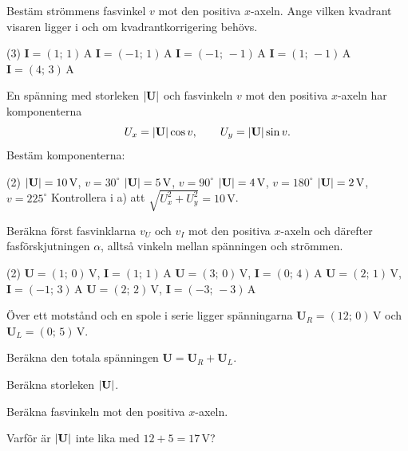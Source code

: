 Bestäm strömmens fasvinkel $v$ mot den positiva $x$-axeln. Ange vilken kvadrant visaren ligger i
och om kvadrantkorrigering behövs.
\begin{delar}(3)
  \task $\mathbf{I} = (1;\, 1)\,\text{A}$
  \task $\mathbf{I} = (-1;\, 1)\,\text{A}$
  \task $\mathbf{I} = (-1;\, -1)\,\text{A}$
  \task $\mathbf{I} = (1;\, -1)\,\text{A}$
  \task $\mathbf{I} = (4;\, 3)\,\text{A}$
\end{delar}

En spänning med storleken $\lvert\mathbf{U}\rvert$ och fasvinkeln $v$ mot den positiva $x$-axeln har
komponenterna
\[
  U_x = \lvert\mathbf{U}\rvert \cos v, \qquad U_y = \lvert\mathbf{U}\rvert \sin v.
\]
Bestäm komponenterna:
\begin{delar}(2)
  \task $\lvert\mathbf{U}\rvert = 10\,\text{V}$, $v = 30^{\circ}$
  \task $\lvert\mathbf{U}\rvert = 5\,\text{V}$, $v = 90^{\circ}$
  \task $\lvert\mathbf{U}\rvert = 4\,\text{V}$, $v = 180^{\circ}$
  \task $\lvert\mathbf{U}\rvert = 2\,\text{V}$, $v = 225^{\circ}$
  \task* Kontrollera i a) att $\sqrt{U_x^2 + U_y^2} = 10\,\text{V}$.
\end{delar}

Beräkna först fasvinklarna $v_U$ och $v_I$ mot den positiva $x$-axeln och därefter
fasförskjutningen $\alpha$, alltså vinkeln mellan spänningen och strömmen.
\begin{delar}(2)
  \task $\mathbf{U} = (1;\, 0)\,\text{V}$, $\mathbf{I} = (1;\, 1)\,\text{A}$
  \task $\mathbf{U} = (3;\, 0)\,\text{V}$, $\mathbf{I} = (0;\, 4)\,\text{A}$
  \task $\mathbf{U} = (2;\, 1)\,\text{V}$, $\mathbf{I} = (-1;\, 3)\,\text{A}$
  \task $\mathbf{U} = (2;\, 2)\,\text{V}$, $\mathbf{I} = (-3;\, -3)\,\text{A}$
\end{delar}

Över ett motstånd och en spole i serie ligger spänningarna $\mathbf{U}_R = (12;\, 0)\,\text{V}$
och $\mathbf{U}_L = (0;\, 5)\,\text{V}$.
\begin{parts}
  \item Beräkna den totala spänningen $\mathbf{U} = \mathbf{U}_R + \mathbf{U}_L$.
  \item Beräkna storleken $\lvert\mathbf{U}\rvert$.
  \item Beräkna fasvinkeln mot den positiva $x$-axeln.
  \item Varför är $\lvert\mathbf{U}\rvert$ inte lika med $12 + 5 = 17\,\text{V}$?
\end{parts}


